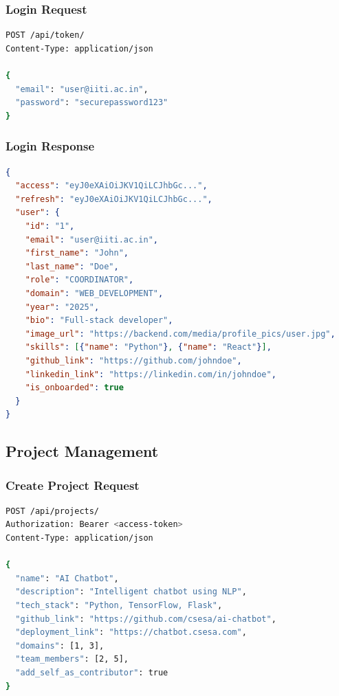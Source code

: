 \documentclass[11pt,a4paper]{article}
\begin{document}
\subsubsection{Login Request}
\begin{lstlisting}[language=bash]
POST /api/token/
Content-Type: application/json

{
  "email": "user@iiti.ac.in",
  "password": "securepassword123"
}
\end{lstlisting}

\subsubsection{Login Response}
\begin{lstlisting}[language=JSON]
{
  "access": "eyJ0eXAiOiJKV1QiLCJhbGc...",
  "refresh": "eyJ0eXAiOiJKV1QiLCJhbGc...",
  "user": {
    "id": "1",
    "email": "user@iiti.ac.in",
    "first_name": "John",
    "last_name": "Doe",
    "role": "COORDINATOR",
    "domain": "WEB_DEVELOPMENT",
    "year": "2025",
    "bio": "Full-stack developer",
    "image_url": "https://backend.com/media/profile_pics/user.jpg",
    "skills": [{"name": "Python"}, {"name": "React"}],
    "github_link": "https://github.com/johndoe",
    "linkedin_link": "https://linkedin.com/in/johndoe",
    "is_onboarded": true
  }
}
\end{lstlisting}

\subsection{Project Management}

\subsubsection{Create Project Request}
\begin{lstlisting}[language=bash]
POST /api/projects/
Authorization: Bearer <access-token>
Content-Type: application/json

{
  "name": "AI Chatbot",
  "description": "Intelligent chatbot using NLP",
  "tech_stack": "Python, TensorFlow, Flask",
  "github_link": "https://github.com/csesa/ai-chatbot",
  "deployment_link": "https://chatbot.csesa.com",
  "domains": [1, 3],
  "team_members": [2, 5],
  "add_self_as_contributor": true
}
\end{lstlisting}
\end{document}
